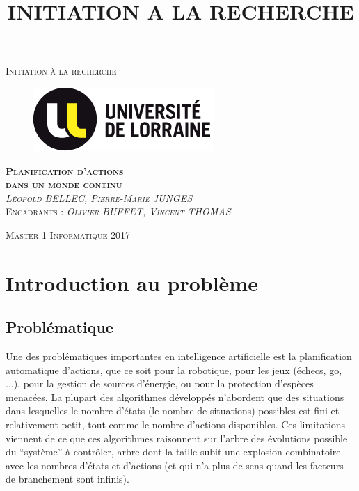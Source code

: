 \documentclass[pdftex,french, english]{article}	%
\begin{document}

\title{INITIATION A LA RECHERCHE}

\begin{titlepage}
\begin{center}

\textsc{\Large Initiation à la recherche}\\[4em]

\begin{figure}[h]
\begin{center}
\includegraphics{lorraine.png}
\end{center}
\end{figure}

\vspace{4em}
\textsc{\Large \textbf{Planification d'actions \\ dans un monde continu}}\\[3em]
\vspace{4em}
\textsc{\textit{Léopold BELLEC, Pierre-Marie JUNGES}}\\[1em]
\vspace{1em}
\textsc{Encadrants : \textit{Olivier BUFFET, Vincent THOMAS}}\\[1em]


\end{center}

\vspace*{\fill}
\textsc{Master 1 Informatique \hspace*{\fill} 2017}

\end{titlepage}

\newpage
{}

\tableofcontents


\newpage
{}
\section{Introduction au problème}
	\subsection{Problématique}
	Une des problématiques importantes en intelligence artificielle est la planification automatique d’actions, que ce soit pour la robotique, pour les jeux (échecs, go, ...), pour la gestion de sources d’énergie, ou pour la protection d’espèces menacées. La plupart des algorithmes développés n’abordent que des situations dans lesquelles le nombre d’états (le nombre de situations) possibles est fini et relativement petit, tout comme le nombre d’actions disponibles. Ces limitations viennent de ce que ces algorithmes raisonnent sur l’arbre des évolutions possible du “système” à contrôler, arbre dont la taille subit une explosion combinatoire avec les nombres d’états et d’actions (et qui n’a plus de sens quand les facteurs de branchement sont infinis).
\end{document}
